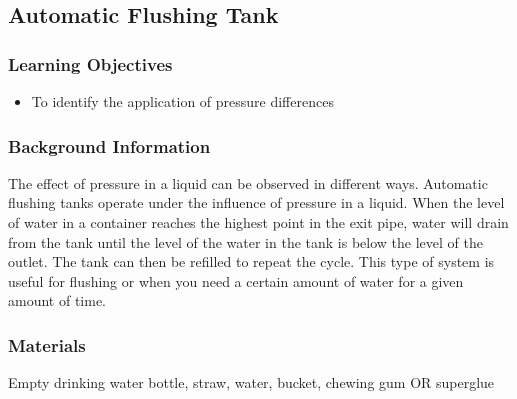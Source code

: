 %
%
	

\subsection{Automatic Flushing Tank}

\subsubsection*{Learning Objectives}
\begin{itemize}
\item{To identify the application of pressure differences}
\end{itemize}

\subsubsection*{Background Information}
The effect of pressure in a liquid can be observed in different ways. Automatic flushing tanks operate under the influence of pressure in a liquid. When the level of water in a container reaches the highest point in the exit pipe, water will drain from the tank until the level of the water in the tank is below the level of the outlet. The tank can then be refilled to repeat the cycle. This type of system is useful for flushing or when you need a certain amount of water for a given amount of time.

\subsubsection*{Materials}
Empty drinking water bottle, straw, water, bucket, chewing gum OR superglue


